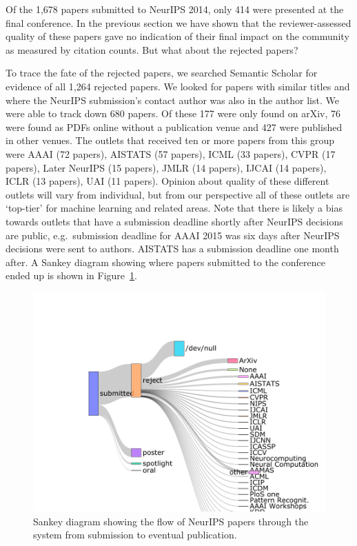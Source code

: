 \documentclass[twoside]{article}
\begin{document}
Of the 1,678 papers submitted to NeurIPS 2014, only 414 were presented
at the final conference. In the previous section we have shown that
the reviewer-assessed quality of these papers gave no indication of
their final impact on the community as measured by citation
counts. But what about the rejected papers?

To trace the fate of the rejected papers, we searched Semantic Scholar
for evidence of all 1,264 rejected papers. We looked for papers with
similar titles and where the NeurIPS submission's contact author was
also in the author list. We were able to track down 680 papers. Of
these 177 were only found on arXiv, 76 were found as PDFs online
without a publication venue and 427 were published in other
venues. The outlets that received ten or more papers from this group
were AAAI (72 papers), AISTATS (57 papers), ICML (33 papers), CVPR (17
papers), Later NeurIPS (15 papers), JMLR (14 papers), IJCAI (14
papers), ICLR (13 papers), UAI (11 papers).  Opinion about quality of
these different outlets will vary from individual, but from our
perspective all of these outlets are `top-tier' for machine learning
and related areas. Note that there is likely a bias towards outlets
that have a submission deadline shortly after NeurIPS decisions are
public, e.g.\ submission deadline for AAAI 2015 was six days after
NeurIPS decisions were sent to authors. AISTATS has a submission
deadline one month after. A Sankey diagram showing where papers
submitted to the conference ended up is shown in Figure~\ref{figure-where-do-neurips-papers-go}.

\begin{figure}[htb]
\includegraphics[width=0.9\columnwidth]{diagrams/neurips/where-do-neurips-papers-go.pdf}

\caption{Sankey diagram showing the flow of NeurIPS papers through the system from submission to eventual publication.}
\label{figure-where-do-neurips-papers-go}
\end{figure}
\end{document}
